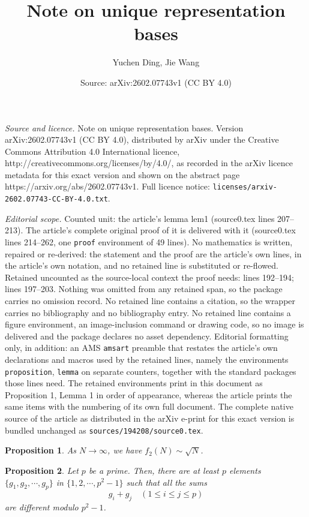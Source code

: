 \documentclass[10pt,a4paper]{amsart}
\title{Note on unique representation bases}
\author{Yuchen Ding, Jie Wang}
\date{Source: arXiv:2602.07743v1 (CC BY 4.0)}
\newtheorem{proposition}{Proposition}
\begin{document}
\maketitle

\noindent\emph{Source and licence.} Note on unique representation bases. Version arXiv:2602.07743v1 (CC BY 4.0), distributed by arXiv under the Creative Commons Attribution 4.0 International licence, http://creativecommons.org/licenses/by/4.0/, as recorded in the arXiv licence metadata for this exact version and shown on the abstract page https://arxiv.org/abs/2602.07743v1. Full licence notice: \texttt{licenses/arxiv-2602.07743-CC-BY-4.0.txt}.\par\smallskip

\noindent\textit{Editorial scope.} Counted unit: the article's lemma lem1 (source0.tex lines 207--213). The article's complete original proof of it is delivered with it (source0.tex lines 214--262, one \texttt{proof} environment of 49 lines). No mathematics is written, repaired or re-derived: the statement and the proof are the article's own lines, in the article's own notation, and no retained line is substituted or re-flowed.  Retained uncounted as the source-local context the proof needs: lines 192--194; lines 197--203.  Nothing was omitted from any retained span, so the package carries no omission record.  No retained line contains a citation, so the wrapper carries no bibliography and no bibliography entry.  No retained line contains a figure environment, an image-inclusion command or drawing code, so no image is delivered and the package declares no asset dependency.  Editorial formatting only, in addition: an AMS \texttt{amsart} preamble that restates the article's own declarations and macros used by the retained lines, namely the environments \texttt{proposition}, \texttt{lemma} on separate counters, together with the standard packages those lines need.  The retained environments print in this document as Proposition 1, Lemma 1 in order of appearance, whereas the article prints the same items with the numbering of its own full document.  The complete native source of the article as distributed in the arXiv e-print for this exact version is bundled unchanged as \texttt{sources/194208/source0.tex}.
\begin{proposition}\label{prop1}
As $N\rightarrow\infty$, we have $f_2(N)\sim \sqrt{N}$.
\end{proposition}

\begin{proposition}\label{prop2}
Let $p$ be a prime. Then, there are at least $p$ elements $\{g_1,g_2,\cdots, g_p\}$ in $\big\{1,2,\cdots,p^2-1\big\}$ such that all the sums
$$
g_i+g_j \quad (1\le i\le j\le p)
$$ 
are different modulo $p^2-1$.
\end{proposition}
\end{document}
